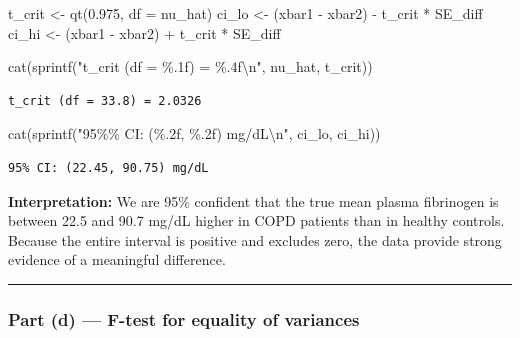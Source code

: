 \documentclass[
  letterpaper,
  DIV=11,
  numbers=noendperiod]{scrartcl}
\newenvironment{Shaded}{\begin{snugshade}}{\end{snugshade}}
\newcommand{\AttributeTok}[1]{\textcolor[rgb]{0.40,0.45,0.13}{#1}}
\newcommand{\FloatTok}[1]{\textcolor[rgb]{0.68,0.00,0.00}{#1}}
\newcommand{\FunctionTok}[1]{\textcolor[rgb]{0.28,0.35,0.67}{#1}}
\newcommand{\NormalTok}[1]{\textcolor[rgb]{0.00,0.23,0.31}{#1}}
\newcommand{\OtherTok}[1]{\textcolor[rgb]{0.00,0.23,0.31}{#1}}
\newcommand{\SpecialCharTok}[1]{\textcolor[rgb]{0.37,0.37,0.37}{#1}}
\newcommand{\StringTok}[1]{\textcolor[rgb]{0.13,0.47,0.30}{#1}}
\begin{document}
\begin{Shaded}
\begin{Highlighting}[]
\NormalTok{t\_crit }\OtherTok{\textless{}{-}} \FunctionTok{qt}\NormalTok{(}\FloatTok{0.975}\NormalTok{, }\AttributeTok{df =}\NormalTok{ nu\_hat)}
\NormalTok{ci\_lo  }\OtherTok{\textless{}{-}}\NormalTok{ (xbar1 }\SpecialCharTok{{-}}\NormalTok{ xbar2) }\SpecialCharTok{{-}}\NormalTok{ t\_crit }\SpecialCharTok{*}\NormalTok{ SE\_diff}
\NormalTok{ci\_hi  }\OtherTok{\textless{}{-}}\NormalTok{ (xbar1 }\SpecialCharTok{{-}}\NormalTok{ xbar2) }\SpecialCharTok{+}\NormalTok{ t\_crit }\SpecialCharTok{*}\NormalTok{ SE\_diff}

\FunctionTok{cat}\NormalTok{(}\FunctionTok{sprintf}\NormalTok{(}\StringTok{"t\_crit (df = \%.1f) = \%.4f}\SpecialCharTok{\textbackslash{}n}\StringTok{"}\NormalTok{, nu\_hat, t\_crit))}
\end{Highlighting}
\end{Shaded}

\begin{verbatim}
t_crit (df = 33.8) = 2.0326
\end{verbatim}

\begin{Shaded}
\begin{Highlighting}[]
\FunctionTok{cat}\NormalTok{(}\FunctionTok{sprintf}\NormalTok{(}\StringTok{"95\%\% CI: (\%.2f, \%.2f) mg/dL}\SpecialCharTok{\textbackslash{}n}\StringTok{"}\NormalTok{, ci\_lo, ci\_hi))}
\end{Highlighting}
\end{Shaded}

\begin{verbatim}
95% CI: (22.45, 90.75) mg/dL
\end{verbatim}

\textbf{Interpretation:} We are 95\% confident that the true mean plasma
fibrinogen is between 22.5 and 90.7 mg/dL higher in COPD patients than
in healthy controls. Because the entire interval is positive and
excludes zero, the data provide strong evidence of a meaningful
difference.

\begin{center}\rule{0.5\linewidth}{0.5pt}\end{center}

\subsubsection{Part (d) --- F-test for equality of
variances}\label{part-d-f-test-for-equality-of-variances}
\end{document}
